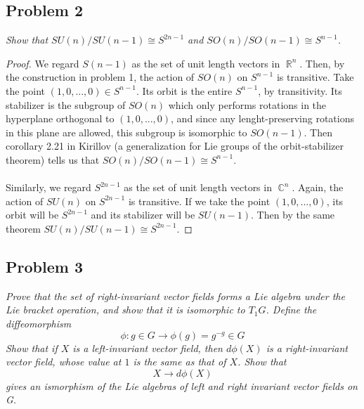 \documentclass[12 pt]{article}
\DeclareMathOperator {\R} {\mathbb{R}}
\DeclareMathOperator {\C} {\mathbb{C}}
\begin{document}
\subsection*{Problem 2}
\emph{Show that $SU(n)/SU(n-1) \cong S^{2n-1}$ and $SO(n)/SO(n-1) \cong S^{n-1}$.}
\begin{proof}
We regard $S(n-1)$ as the set of unit length vectors in $\R^n$. Then, by the construction in problem 1, the action of $SO(n)$ on $S^{n-1}$ is transitive. Take the point $(1, 0, ... , 0) \in S^{n-1}$. Its orbit is the entire $S^{n-1}$, by transitivity. Its stabilizer is the subgroup of $SO(n)$ which only performs rotations in the hyperplane orthogonal to $(1, 0 , ... , 0)$, and since any lenght-preserving rotations in this plane are allowed, this subgroup is isomorphic to $SO(n-1)$. Then corollary 2.21 in Kirillov (a generalization for Lie groups of the orbit-stabilizer theorem) tells us that $SO(n)/SO(n-1) \cong S^{n-1}$.
\\
\\
Similarly, we regard $S^{2n-1}$ as the set of unit length vectors in $\C^n$. Again, the action of $SU(n)$ on $S^{2n-1}$ is transitive. If we take the point $(1, 0, ... , 0)$, its orbit will be $S^{2n-1}$ and its stabilizer will be $SU(n-1)$. Then by the same theorem $SU(n)/SU(n-1) \cong S^{2n-1}$.
\end{proof}

\subsection*{Problem 3}
\emph{Prove that the set of right-invariant vector fields forms a Lie algebra under the Lie bracket operation, and show that it is isomorphic to $T_1G$. Define the diffeomorphism}
\[  \phi : g \in G \to \phi(g) = g^{-g} \in G   \]
\emph{Show that if $X$ is a left-invariant vector field, then $d\phi(X)$ is a right-invariant vector field, whose value at $1$ is the same as that of $X$. Show that}
\[   X \to  d\phi(X)   \]
\emph{gives an ismorphism of the Lie algebras of left and right invariant vector fields on G.}
\end{document}
